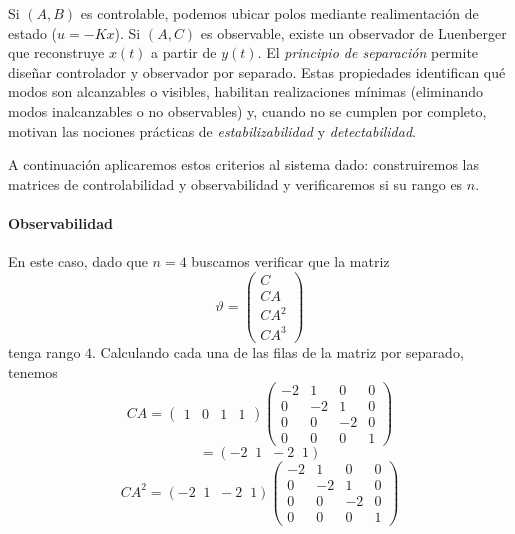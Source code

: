 \documentclass[
  11pt,
  letterpaper,
   addpoints,
   answers
  ]{exam}
\begin{document}
\begin{questions}
\begin{solution}
Si $(A,B)$ es controlable, podemos ubicar polos mediante realimentación de estado ($u=-Kx$). Si $(A,C)$
es observable, existe un observador de Luenberger que reconstruye $x(t)$ a partir de $y(t)$. El
\emph{principio de separación} permite diseñar controlador y observador por separado. Estas propiedades
identifican qué modos son alcanzables o visibles, habilitan realizaciones mínimas (eliminando modos
inalcanzables o no observables) y, cuando no se cumplen por completo, motivan las nociones prácticas de
\emph{estabilizabilidad} y \emph{detectabilidad}.

A continuación aplicaremos estos criterios al sistema dado: construiremos las matrices de
controlabilidad y observabilidad y verificaremos si su rango es $n$.

\paragraph*{Observabilidad}
En este caso, dado que $n=4$ buscamos verificar que la matriz
\setcounter{equation}{42}
\begin{equation}
\vartheta =
\begin{pmatrix}
C\\
CA\\
CA^{2}\\
CA^{3}
\end{pmatrix}
\end{equation}
tenga rango $4$. Calculando cada una de las filas de la matriz por separado, tenemos
\begin{equation}
CA=\begin{pmatrix}1&0&1&1\end{pmatrix}
\begin{pmatrix}
-2&1&0&0\\
0&-2&1&0\\
0&0&-2&0\\
0&0&0&1
\end{pmatrix}
\end{equation}
\begin{equation}
=(-2\;\;1\;\;-2\;\;1)
\end{equation}
\begin{equation}
CA^{2}=(-2\;\;1\;\;-2\;\;1)
\begin{pmatrix}
-2&1&0&0\\
0&-2&1&0\\
0&0&-2&0\\
0&0&0&1
\end{pmatrix}
\end{equation}
\begin{equation}

\end{equation}
\end{solution}
\end{questions}
\end{document}
